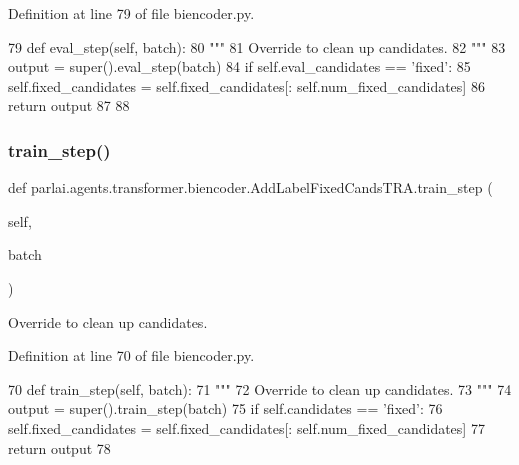 Definition at line 79 of file biencoder.\+py.


\begin{DoxyCode}
79     \textcolor{keyword}{def }eval\_step(self, batch):
80         \textcolor{stringliteral}{"""}
81 \textcolor{stringliteral}{        Override to clean up candidates.}
82 \textcolor{stringliteral}{        """}
83         output = super().eval\_step(batch)
84         \textcolor{keywordflow}{if} self.eval\_candidates == \textcolor{stringliteral}{'fixed'}:
85             self.fixed\_candidates = self.fixed\_candidates[: self.num\_fixed\_candidates]
86         \textcolor{keywordflow}{return} output
87 
88 
\end{DoxyCode}
\mbox{\label{classparlai_1_1agents_1_1transformer_1_1biencoder_1_1AddLabelFixedCandsTRA_ae051c7783bdd5e8b9ddc920059409b5d}} 
\subsubsection{\texorpdfstring{train\+\_\+step()}{train\_step()}}
{\footnotesize\ttfamily def parlai.\+agents.\+transformer.\+biencoder.\+Add\+Label\+Fixed\+Cands\+T\+R\+A.\+train\+\_\+step (\begin{DoxyParamCaption}\item[{}]{self,  }\item[{}]{batch }\end{DoxyParamCaption})}

\begin{DoxyVerb}Override to clean up candidates.
\end{DoxyVerb}
 

Definition at line 70 of file biencoder.\+py.


\begin{DoxyCode}
70     \textcolor{keyword}{def }train\_step(self, batch):
71         \textcolor{stringliteral}{"""}
72 \textcolor{stringliteral}{        Override to clean up candidates.}
73 \textcolor{stringliteral}{        """}
74         output = super().train\_step(batch)
75         \textcolor{keywordflow}{if} self.candidates == \textcolor{stringliteral}{'fixed'}:
76             self.fixed\_candidates = self.fixed\_candidates[: self.num\_fixed\_candidates]
77         \textcolor{keywordflow}{return} output
78 
\end{DoxyCode}


